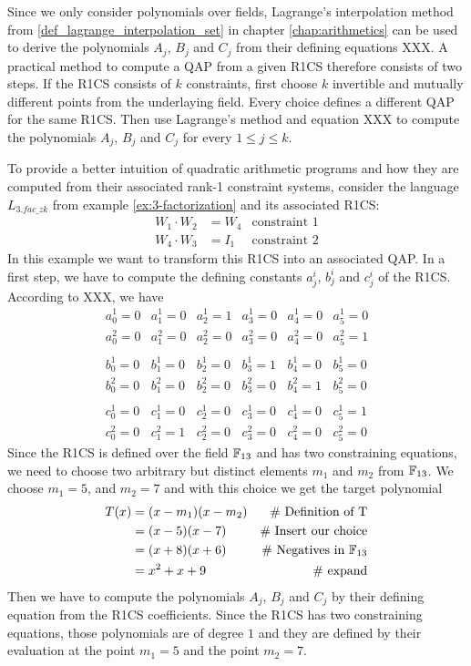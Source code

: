 Since we only consider polynomials over fields, Lagrange's interpolation method from \ref{def_lagrange_interpolation_set} in chapter \ref{chap:arithmetics} can be used to derive the polynomials $A_j$, $B_j$ and $C_j$ from their defining equations XXX. A practical method to compute a QAP from a given R1CS therefore consists of two steps. If the R1CS consists of $k$ constraints, first choose $k$ invertible and mutually different points from the underlaying field. Every choice defines a different QAP for the same R1CS. Then use Lagrange's method and equation XXX to compute the polynomials $A_j$, $B_j$ and $C_j$ for every $1\leq j \leq k$. 
\begin{example}  To provide a better intuition of quadratic arithmetic programs and how they are computed from their associated rank-1 constraint systems, consider the language $L_{3.fac\_zk}$ from example \ref{ex:3-factorization} and its associated R1CS:
\begin{align*}
W_1 \cdot W_2 & = W_4 & \text{constraint } 1\\
W_4 \cdot W_3 & = I_1 & \text{constraint } 2
\end{align*}
In this example we want to transform this R1CS into an associated QAP. In a first step, we have to compute the defining constants $a_j^i$, $b_j^i$ and $c_j^i$ of the R1CS. According to XXX, we have
$$
\begin{array}{llllll}
a_0^1 = 0 & a_1^1= 0 & a_2^1= 1 & a_3^1 = 0 & a_4^1= 0  & a_5^1= 0 \\ 
a_0^2 = 0 & a_1^2= 0 & a_2^2= 0 & a_3^2 = 0 & a_4^2= 0  & a_5^2= 1 \\ 
\\
b_0^1 = 0 & b_1^1= 0 & b_2^1= 0 & b_3^1 = 1 & b_4^1= 0  & b_5^1= 0 \\ 
b_0^2 = 0 & b_1^2= 0 & b_2^2= 0 & b_3^2 = 0 & b_4^2= 1  & b_5^2= 0 \\ 
\\
c_0^1 = 0 & c_1^1= 0 & c_2^1= 0 & c_3^1 = 0 & c_4^1= 0  & c_5^1= 1 \\ 
c_0^2 = 0 & c_1^2= 1 & c_2^2= 0 & c_3^2 = 0 & c_4^2= 0  & c_5^2= 0 
\end{array} 
$$
Since the R1CS is defined over the field $\mathbb{F}_{13}$ and has two constraining equations, we need to choose two arbitrary but distinct elements $m_1$ and $m_2$ from $\mathbb{F}_{13}$. We choose $m_{1}=5$, and $m_{2}=7$ and with this choice we get the target polynomial
\begin{align*}
T(x) & = (x-m_1)(x-m_2) & \text{\# Definition of T}\\
     & = (x-5)(x-7)  & \text{\# Insert our choice}\\
     & = (x+8)(x+6)  & \text{\# Negatives in } \mathbb{F}_{13}\\
     & = x^2 + x +9 & \text{\# expand}
\end{align*}
Then we have to compute the polynomials $A_j$, $B_j$ and $C_j$ by their defining equation from the R1CS coefficients. Since the R1CS has two constraining equations, those polynomials are of degree $1$ and they are defined by their evaluation at the point $m_1=5$ and the point $m_2=7$. 


\end{example}
